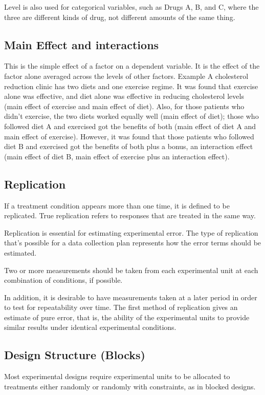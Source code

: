 \documentclass[a4paper,12pt]{article}
\begin{document}
Level is also used for categorical variables, such as Drugs A, B, and C, where the three are different kinds of drug, not different amounts of the same thing.

\subsection{Main Effect and interactions}
This is the simple effect of a factor on a dependent variable. It is the effect of the factor alone averaged across the levels of other factors.
Example 
A cholesterol reduction clinic has two diets and one exercise regime. It was found that exercise alone was effective, and diet alone was effective in reducing cholesterol levels (main effect of exercise and main effect of diet).  
Also, for those patients who didn't exercise, the two diets worked equally well (main effect of diet); those who followed diet A and exercised got the benefits of both (main effect of diet A and main effect of exercise). 
However, it was found that those patients who followed diet B and exercised got the benefits of both plus a bonus, an interaction effect (main effect of diet B, main effect of exercise plus an interaction effect).

\subsection{Replication}
If a treatment condition appears more than one time, it is defined to be replicated. True replication refers to responses that are treated in the same way. 

Replication is essential for estimating experimental error. The type of replication that’s possible for a data collection plan represents how the error terms should be estimated. 

Two or more measurements should be taken from each experimental unit at each combination of conditions, if possible. 

In addition, it is desirable to have measurements taken at a later period in order to test for repeatability over time. The first method of replication gives an estimate of pure error, that is, the ability of the experimental units to provide similar results under identical experimental conditions. 


\subsection{Design Structure (Blocks)}
Most experimental designs require experimental units to be allocated to treatments either randomly or randomly with constraints, as in blocked designs.
\end{document}
